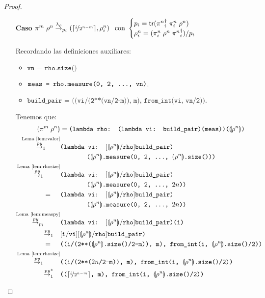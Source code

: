 \begin{proof}
\begin{itemize}
    \item[\textbf{Caso}] \(\pi^m\;\rho^n \overset{\lambda_\rho}{\rightarrow}_{p_i} (\lceil \nicefrac{i}{2^{n-m}}\rceil, \rho_i^n) \;\, \text{ con }
\begin{cases}
p_i = \mathsf{tr}({\pi^n}_i^\dagger\;\pi^n_i\;\rho^n)\\
\rho^n_i = (\pi^n_i\;\rho^n\;{\pi^n}_i^\dagger)/p_i
\end{cases}\)

Recordando las definiciones auxiliares:
\begin{itemize}
    \item $\texttt{vn = rho.size()}$
    \item $\texttt{meas = rho.measure(0, 2, \dots, vn)}$.
    \item $\texttt{build\_pair = ((vi/(2**(vn/2-m)), m), from\_int(vi, vn/2))}$.
\end{itemize}
Tenemos que:
\begin{align*}
\transl{\pi^m\;\rho^n} &= \texttt{(lambda rho: (lambda vi: build\_pair)(meas))(\transl{\rho^n})} \\
\stackrel{\textrm{Lema~\ref{lem:valor}}}{\redpy_1} &\texttt{(lambda vi: }[\transl{\rho^n}/\texttt{rho}]\texttt{build\_pair)}\\
&\qquad\qquad \texttt{(\transl{\rho^n}.measure(0, 2, \dots, \transl{\rho^n}.size()))} \\
\stackrel{\textrm{Lema~\ref{lem:rhosize}}}{\redpy_1} &\texttt{(lambda vi: }[\transl{\rho^n}/\texttt{rho}]\texttt{build\_pair)}\\
&\qquad\qquad \texttt{(\transl{\rho^n}.measure(0, 2, \dots, $2n$))} \\
=\quad\;\,&\texttt{(lambda vi: }[\transl{\rho^n}/\texttt{rho}]\texttt{build\_pair)}\\
&\qquad\qquad \texttt{(\transl{\rho^n}.measure(0, 2, \dots, $2n$))} \\
\stackrel{\textrm{Lema~\ref{lem:measpy}}}{\redpy_{p_i}} &\texttt{(lambda vi: }[\transl{\rho^n}/\texttt{rho}]\texttt{build\_pair)(i)} \\
\redpy_1 \quad &[\texttt{i}/\texttt{vi}][\transl{\rho^n}/\texttt{rho}]\texttt{build\_pair)} \\
=\quad\;\,&\texttt{((i/(2**(\transl{\rho^n}.size()/2-m)), m), from\_int(i, \transl{\rho^n}.size()/2))}\\
\stackrel{\textrm{Lema~\ref{lem:rhosize}}}{\redpy_1} &\texttt{((i/(2**($2n$/2-m)), m), from\_int(i, \transl{\rho^n}.size()/2))}\\
\redpy^*_1 \quad&\texttt{((}\lceil \nicefrac{i}{2^{n-m}}\rceil\texttt{, m), from\_int(i, \transl{\rho^n}.size()/2))}\\

\end{align*}
\end{itemize}
\end{proof}
